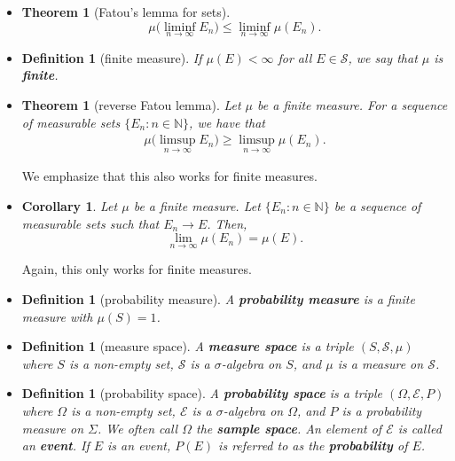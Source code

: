 \documentclass[10pt]{article}
\newtheorem{theorem}[lemma]{Theorem}
\newtheorem{definition}[lemma]{Definition}
\newtheorem{corollary}[lemma]{Corollary}
\numberwithin{lemma}{section}
\newcommand{\mcal}[1]{\mathcal{#1}}
\newcommand{\Nat}{\mathbb{N}}
\begin{document}
\begin{itemize}
  \item \begin{theorem}[Fatou's lemma for sets]
    $$\mu \bigg( \liminf_{n \rightarrow \infty } E_n \bigg) \leq \liminf_{n \rightarrow \infty} \mu(E_n).$$
  \end{theorem}

  \item \begin{definition}[finite measure]
    If $\mu(E) < \infty$ for all $E \in \mcal{S}$, we say that $\mu$ is {\bf finite}.
  \end{definition}

  \item \begin{theorem}[reverse Fatou lemma]
    Let $\mu$ be a finite measure. For a sequence of measurable sets $\{ E_n : n \in \Nat \}$, we have that
    \begin{align*}
      \mu\bigg(\limsup_{n \rightarrow \infty} E_n\bigg) \geq \limsup_{n \rightarrow \infty} \mu(E_n).
    \end{align*}
  \end{theorem}
  We emphasize that this also works for finite measures.

  \item \begin{corollary}
  Let $\mu$ be a finite measure. Let $\{ E_n : n \in \Nat \}$ be a sequence of measurable sets such that  $E_n \rightarrow E$. Then, $$\lim_{n \rightarrow \infty} \mu(E_n) = \mu(E).$$
  \end{corollary}
  Again, this only works for finite measures.
  
  \item \begin{definition}[probability measure] 
    A {\bf probability measure} is a finite measure with $\mu(S) = 1$.
  \end{definition}

  \item \begin{definition}[measure space] 
    A {\bf measure space} is a triple $(S, \mcal{S}, \mu)$ where $S$ is a non-empty set, $\mcal{S}$ is a $\sigma$-algebra on $S$, and $\mu$ is a measure on $\mcal{S}$.
  \end{definition}

  \item \begin{definition}[probability space]
    A {\bf probability space} is a triple $(\Omega, \mcal{E}, P)$ where $\Omega$ is a non-empty set, $\mcal{E}$ is a $\sigma$-algebra on $\Omega$, and $P$ is a probability measure on $\Sigma$. We often call $\Omega$ the {\bf sample space}. An element of $\mcal{E}$ is called an {\bf event}. If $E$ is an event, $P(E)$ is referred to as the {\bf probability} of $E$.
  \end{definition}
\end{itemize}
\end{document}
